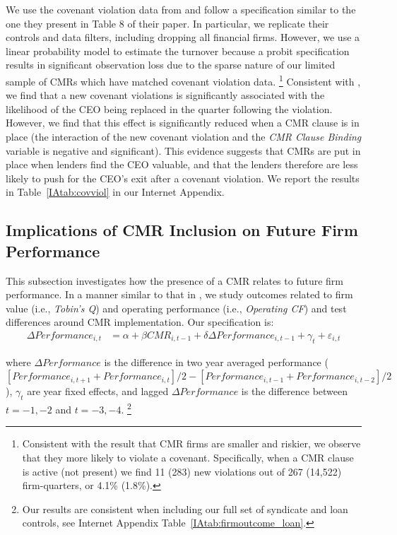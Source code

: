 \documentclass[a4paper,12pt]{article}
\begin{document}
We use the covenant violation data from \cite{Nini_2012} and follow a specification similar to the one they present in Table 8 of their paper.
In particular, we replicate their controls and data filters, including dropping all financial firms.
However, we use a linear probability model to estimate the turnover because a probit specification results in significant observation loss due to the sparse nature of our limited sample of CMRs which have matched covenant violation data.%
    \footnote{Consistent with the result that CMR firms are smaller and riskier, we observe that they more likely to violate a covenant.
    Specifically, when a CMR clause is active (not present) we find 11 (283) new violations out of 267 (14,522) firm-quarters, or 4.1\% (1.8\%).}
Consistent with \cite{Nini_2012}, we find that a new covenant violations is significantly associated with the likelihood of the CEO being replaced in the quarter following the violation.
However, we find that this effect is significantly reduced when a CMR clause is in place (the interaction of the new covenant violation and the \textit{CMR Clause Binding} variable is negative and significant).
This evidence suggests that CMRs are put in place when lenders find the CEO valuable, and that the lenders therefore are less likely to push for the CEO’s exit after a covenant violation.
We report the results in Table~\ref{IAtab:covviol} in our Internet Appendix.




\subsection{Implications of CMR Inclusion on Future Firm Performance}
\label{section:Performance}

This subsection investigates how the presence of a CMR relates to future firm performance.
In a manner similar to that in \cite{Nini_2009}, we study outcomes related to firm value (i.e., \textit{Tobin's Q}) and operating performance (i.e., \textit{Operating CF}) and test  differences around CMR implementation.
Our specification is:
\begin{align}
\Delta Performance_{i,t} &= \alpha + \beta CMR_{i,t-1} + \delta \Delta Performance_{i,t-1} + \gamma_t + \varepsilon_{i,t}
\end{align}%

\noindent
where $\Delta Performance$ is the difference in two year averaged performance ($[Performance_{i,t+1} + Performance_{i,t}]/2 - [Performance_{i,t-1} + Performance_{i,t-2}]/2$), $ \gamma_t $ are year fixed effects, and lagged $\Delta Performance$ is the difference between $t=-1,-2$ and $t=-3,-4$.%
    \footnote{Our results are consistent when including our full set of syndicate and loan controls, see Internet Appendix Table~\ref{IAtab:firmoutcome_loan}.}
\end{document}
